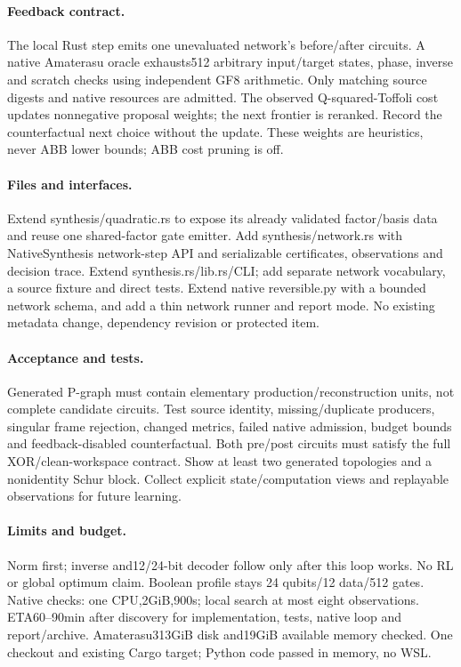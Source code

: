 \documentclass{article}
\begin{document}
\paragraph{Feedback contract.} The local Rust step emits one unevaluated
network's before/after circuits. A native Amaterasu oracle exhausts512 arbitrary
input/target states, phase, inverse and scratch checks using independent GF8
arithmetic. Only matching source digests and native resources are admitted.
The observed Q-squared-Toffoli cost updates nonnegative proposal weights; the next
frontier is reranked. Record the counterfactual next choice without the update.
These weights are heuristics, never ABB lower bounds; ABB cost pruning is off.
\paragraph{Files and interfaces.} Extend synthesis/quadratic.rs to expose its
already validated factor/basis data and reuse one shared-factor gate emitter.
Add synthesis/network.rs with NativeSynthesis network-step API and serializable
certificates, observations and decision trace. Extend synthesis.rs/lib.rs/CLI;
add separate network vocabulary, a source fixture and direct tests. Extend native
reversible.py with a bounded network schema, and add a thin network runner and
report mode. No existing metadata change, dependency revision or protected item.
\paragraph{Acceptance and tests.} Generated P-graph must contain elementary
production/reconstruction units, not complete candidate circuits. Test source
identity, missing/duplicate producers, singular frame rejection, changed metrics,
failed native admission, budget bounds and feedback-disabled counterfactual.
Both pre/post circuits must satisfy the full XOR/clean-workspace contract. Show
at least two generated topologies and a nonidentity Schur block. Collect explicit
state/computation views and replayable observations for future learning.
\paragraph{Limits and budget.} Norm first; inverse and12/24-bit decoder follow
only after this loop works. No RL or global optimum claim. Boolean profile stays
24 qubits/12 data/512 gates. Native checks: one CPU,2GiB,900s; local search at most
eight observations. ETA60--90min after discovery for implementation, tests, native
loop and report/archive. Amaterasu313GiB disk and19GiB available memory checked.
One checkout and existing Cargo target; Python code passed in memory, no WSL.
\end{document}
